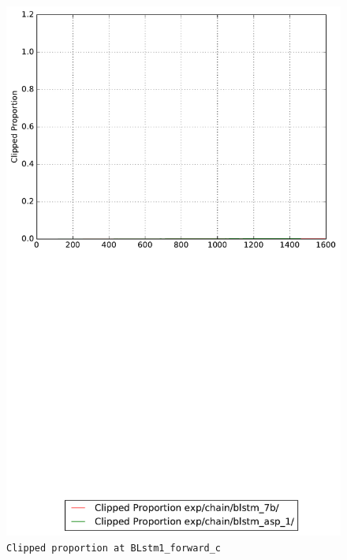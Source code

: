\documentclass[prl,10pt,twocolumn]{revtex4}
\begin{document}
\newpage
\begin{figure}[h]
  \begin{center}
    \caption{\texttt{Clipped proportion at BLstm1\_forward\_c}}
    \includegraphics[width=\textwidth]{exp/chain/blstm_7b/report/clipped_proportion_BLstm1_forward_c.pdf}
  \end{center}
\end{figure}
\clearpage
\end{document}
